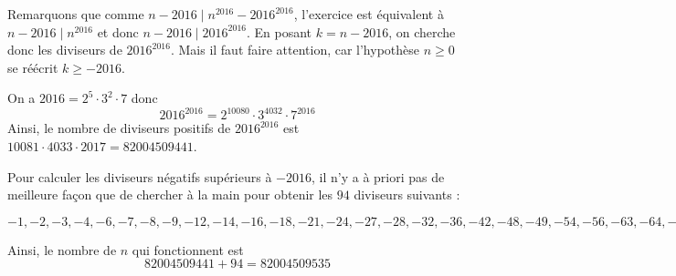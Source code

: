 
Remarquons que comme $n - 2016 \mid n^{2016} - 2016^{2016}$, l'exercice est équivalent à $n - 2016\mid n^{2016}$ et donc $n - 2016\mid 2016^{2016}$. En posant $k = n - 2016$, on cherche donc les diviseurs de $2016^2016$. Mais il faut faire attention, car l'hypothèse $n\ge 0$ se réécrit $k\ge  - 2016$.

On a $2016 = 2^{5}\cdot 3^2\cdot 7$ donc
$$2016^{2016} = 2^{10080}\cdot 3^{4032}\cdot 7^{2016}$$
Ainsi, le nombre de diviseurs positifs de $2016^{2016}$ est $10081\cdot 4033\cdot 2017 = 82004509441$.

Pour calculer les diviseurs négatifs supérieurs à $ -2016$, il n'y a à priori pas de meilleure façon que de chercher à la main pour obtenir les $94$ diviseurs suivants :

$-1, -2, -3, -4, -6, -7, -8, -9, -12, -14, -16, -18, -21, -24, -27, -28, -32, -36, -42, -48, -49, -54, -56, -63, -64, -72, -81, -84, -96, -98, -108, -112, -126, -128, -144, -147, -162, -168, -189, -192, -196, -216, -224, -243, -252, -256, -288, -294, -324, -336, -343, -378, -384, -392, -432, -441, -448, -486, -504, -512, -567, -576, -588, -648, -672, -686, -729, -756, -768, -784, -864, -882, -896, -972, -1008, -1024, -1029, -1134, -1152, -1176, -1296, -1323, -1344, -1372, -1458, -1512, -1536, -1568, -1701, -1728, -1764, -1792, -1944, -2016$

Ainsi, le nombre de $n$ qui fonctionnent est
$$82004509441 + 94 = 82004509535$$